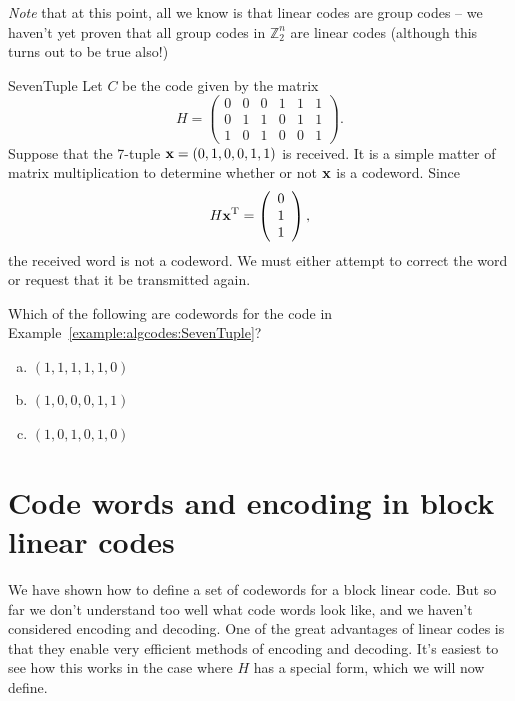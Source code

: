  \noindent
\emph{Note} that at this point, all we know is that linear codes are group codes -- we haven't yet proven that all group codes in $\mathbb{Z}_2^n$ are linear codes (although this turns out to be true also!)
 
\begin{example}{SevenTuple}
Let $C$ be the code given by the matrix
\[
H =
\left(
\begin{array}{cccccc}
0 & 0 & 0 & 1 & 1 & 1 \\
0 & 1 & 1 & 0 & 1 & 1 \\
1 & 0 & 1 & 0 & 0 & 1
\end{array}
\right).
\]
Suppose that the 7-tuple ${\bold x} = (0,1,0,0,1,1)$ is received.
It is a simple matter of matrix multiplication to determine whether or
not ${\bold x}$ is a codeword. Since 
\[
H{\bold x}^{\mathrm{T}} =
\left(
\begin{array}{c}
0 \\
1 \\
1
\end{array}
\right),
\]
the received word is not a codeword.  We must either attempt to
correct the word or request that it be transmitted again.
\end{example}

\begin{exercise}{}
Which of the following are codewords for the code in Example~\ref{example:algcodes:SevenTuple}?
\begin{enumerate}[(a)]
\item
$(1,1,1,1,1,0)$
\item
$(1,0,0,0,1,1)$
\item
$(1,0,1,0,1,0)$
\end{enumerate}
\end{exercise}


 
\section{Code words and encoding in block linear codes}
 
We have shown how to define a set of codewords for a block linear code. But so far we don't understand too well what code words look like, and we haven't considered encoding and decoding. One of the great advantages of linear codes is that they enable  very efficient methods of encoding and decoding.  It's easiest to see how this works in the case where $H$ has a special form, which we will now define.

